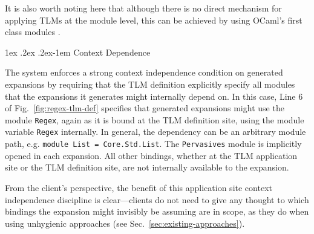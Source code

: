 \documentclass[acmsmall]{acmart}
\makeatletter
\renewcommand{\subsubsection}{%
  \@startsection{subsubsection}{3}%
  {\z@}{1ex \@plus .2ex \@minus .2ex}{-1em}%
  {\normalfont\normalsize\bfseries}%
}
\newcommand{\li}[1]{\lstinline[basicstyle=\ttfamily\fontsize{9pt}{1em}\selectfont]{#1}}
\makeatother
\begin{document}
It is also worth noting here that although there is no direct mechanism for applying TLMs at the module level, this can be achieved by using OCaml's first class modules \cite{ocaml-manual}.

\subsubsection{Context Dependence}
\label{sec:context-dependence}


The system enforces a strong context independence condition on generated expansions by requiring that the TLM definition explicitly specify all modules that the expansions it generates might internally depend on. In this case, Line 6 of Fig.~\ref{fig:regex-tlm-def} specifies that generated expansions might use the module \li{Regex}, again as it is bound at the TLM definition site, using the module variable \li{Regex} internally. In  general, the dependency can be an arbitrary module path, e.g. \li{module List = Core.Std.List}. The \li{Pervasives} module is implicitly opened in each expansion. All other bindings, whether at the TLM application site or the TLM definition site, are not internally available to the expansion. 



From the client's perspective, the benefit of this application site context independence discipline is clear---clients do not need to give any thought to which bindings the expansion might invisibly be assuming are in scope, as they do when using unhygienic approaches (see Sec.~\ref{sec:existing-approaches}).%
\end{document}
